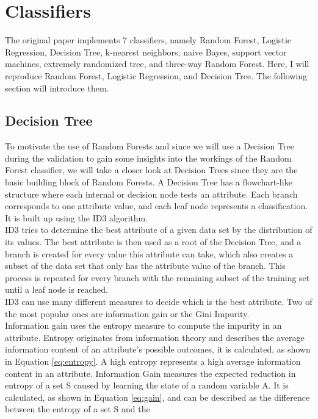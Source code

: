 \section{Classifiers}
The original paper \cite{RN127} implements 7 classifiers, namely Random Forest, 
Logistic Regression, Decision Tree, k-nearest neighbors, naive Bayes, support 
vector machines, extremely randomized tree, and three-way Random Forest. Here, 
I 
will reproduce Random Forest, Logistic Regression, and Decision Tree. The 
following section will introduce them.
\subsection{Decision Tree}
To motivate the use of Random Forests and since we will 
use a Decision Tree during the validation to gain some insights into the 
workings of the Random Forest classifier, we will take a closer look 
at Decision Trees since they are the basic building block of Random Forests.
A Decision Tree has a flowchart-like structure where each internal or decision 
node tests an attribute. Each branch corresponds to one attribute value, and 
each leaf node represents a classification. It is built up using the ID3 
algorithm.\cite{RN171}
\\
ID3 tries to determine the best attribute of a given data set by the 
distribution of its values. The best attribute is then used as a root of the 
Decision Tree, and a branch is created for every value this attribute can take, 
which also creates a subset of the data set that only has the attribute value 
of the branch. This process is repeated for every branch with the remaining 
subset of the training set until a leaf node is reached. \cite{RN165}
\\
ID3 can use many different measures to decide which is the best attribute. Two 
of the most popular ones are information gain or the Gini Impurity.
\\
Information gain uses the entropy measure to compute the impurity in an 
attribute. Entropy originates from information theory and describes the average 
information content of an attribute's possible outcomes, it is calculated, as 
shown in Equation \ref{eq:entropy}. A high entropy represents a high average 
information content in an attribute. Information Gain measures the expected 
reduction in entropy of a set S caused by learning the state of a random 
variable A.  It is calculated, as shown in Equation \ref{eq:gain}, and can be 
described as the difference between the entropy of a set S and the 
